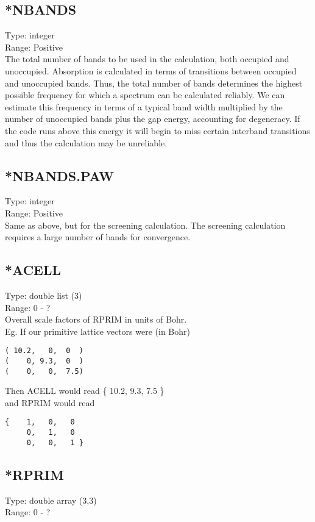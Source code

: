 \documentclass[12pt]{revtex4}
\begin{document}
\subsection{*NBANDS}
Type: integer \\
Range: Positive \\

The total number of bands to be used in the calculation, both occupied and unoccupied.
Absorption is calculated in terms of transitions between occupied and 
unoccupied bands. Thus, the total number of bands determines the highest 
possible frequency for which a spectrum can be calculated reliably. We can
estimate this frequency in terms of a typical band width multiplied by the number of
unoccupied bands plus the gap energy, accounting for degeneracy. If the code runs above this energy it 
will begin to miss certain interband transitions and thus the calculation
may be unreliable.

\subsection{*NBANDS.PAW}
Type: integer \\
Range: Positive \\

Same as above, but for the screening calculation. The screening calculation requires a large number of 
bands for convergence. 

\subsection{*ACELL}
Type: double list (3) \\
Range: 0 - ? \\

Overall scale factors of RPRIM in units of Bohr. \\
Eg. If our primitive lattice vectors were (in Bohr)
\begin{verbatim}
( 10.2,   0,  0  )     
(    0, 9.3,  0  )       
(    0,   0,  7.5) 
\end{verbatim}

Then ACELL would read \{ 10.2, 9.3, 7.5 \} \\
and RPRIM would read
\begin{verbatim}
{    1,   0,   0      
     0,   1,   0        
     0,   0,   1 } 
\end{verbatim}

\subsection{*RPRIM}
Type: double array (3,3)\\
Range: 0 - ? \\
\end{document}
